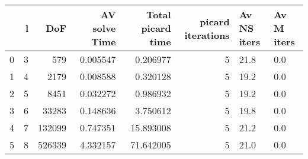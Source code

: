 \begin{tabular}{lrrrrrll}
\toprule
{} &  l &     DoF &  AV solve Time &  Total picard time &  picard iterations & Av NS iters & Av M iters \\
\midrule
0 &  3 &     579 &       0.005547 &           0.206977 &                  5 &        21.8 &        0.0 \\
1 &  4 &    2179 &       0.008588 &           0.320128 &                  5 &        19.2 &        0.0 \\
2 &  5 &    8451 &       0.032272 &           0.986932 &                  5 &        19.2 &        0.0 \\
3 &  6 &   33283 &       0.148636 &           3.750612 &                  5 &        19.8 &        0.0 \\
4 &  7 &  132099 &       0.747351 &          15.893008 &                  5 &        21.2 &        0.0 \\
5 &  8 &  526339 &       4.332157 &          71.642005 &                  5 &        21.0 &        0.0 \\
\bottomrule
\end{tabular}
